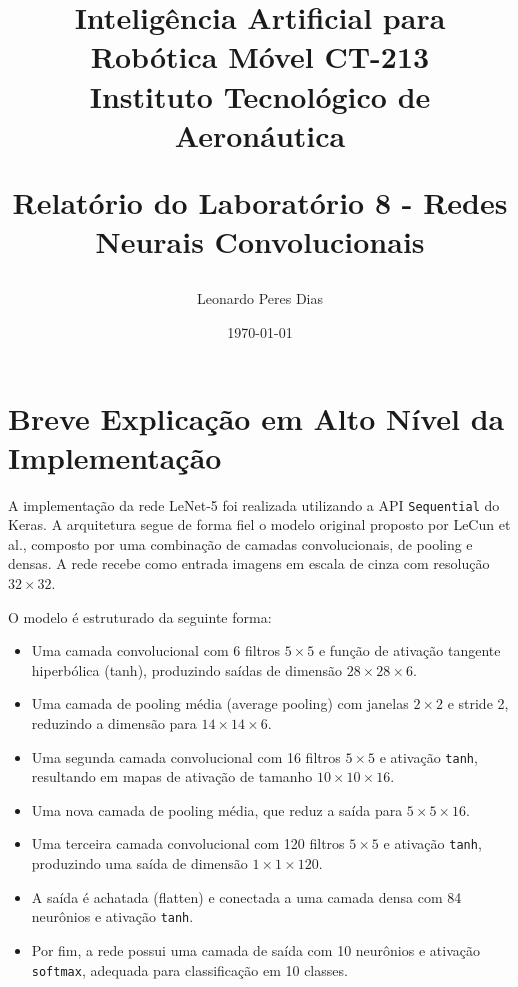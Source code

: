 \documentclass[a4paper,12pt]{article}
\title{
    \textbf{Inteligência Artificial para Robótica Móvel CT-213}\\
    \Large Instituto Tecnológico de Aeronáutica 

    \textbf{Relatório do Laboratório 8 - Redes Neurais Convolucionais}\\
}
\author{
    Leonardo Peres Dias 
}
\date{\today}
\begin{document}
\BgThispage
\maketitle
\thispagestyle{empty} %


\newpage
\NoBgThispage %

\tableofcontents

\newpage
\NoBgThispage %

\section{Breve Explicação em Alto Nível da Implementação}

A implementação da rede LeNet-5 foi realizada utilizando a API \texttt{Sequential} do Keras. A arquitetura segue de forma fiel o modelo original proposto por LeCun et al., composto por uma combinação de camadas convolucionais, de pooling e densas. A rede recebe como entrada imagens em escala de cinza com resolução $32 \times 32$.

O modelo é estruturado da seguinte forma:

\begin{itemize}
    \item Uma camada convolucional com 6 filtros $5 \times 5$ e função de ativação tangente hiperbólica (tanh), produzindo saídas de dimensão $28 \times 28 \times 6$.
    \item Uma camada de pooling média (average pooling) com janelas $2 \times 2$ e stride 2, reduzindo a dimensão para $14 \times 14 \times 6$.
    \item Uma segunda camada convolucional com 16 filtros $5 \times 5$ e ativação \texttt{tanh}, resultando em mapas de ativação de tamanho $10 \times 10 \times 16$.
    \item Uma nova camada de pooling média, que reduz a saída para $5 \times 5 \times 16$.
    \item Uma terceira camada convolucional com 120 filtros $5 \times 5$ e ativação \texttt{tanh}, produzindo uma saída de dimensão $1 \times 1 \times 120$.
    \item A saída é achatada (flatten) e conectada a uma camada densa com 84 neurônios e ativação \texttt{tanh}.
    \item Por fim, a rede possui uma camada de saída com 10 neurônios e ativação \texttt{softmax}, adequada para classificação em 10 classes.
\end{itemize}
\end{document}
